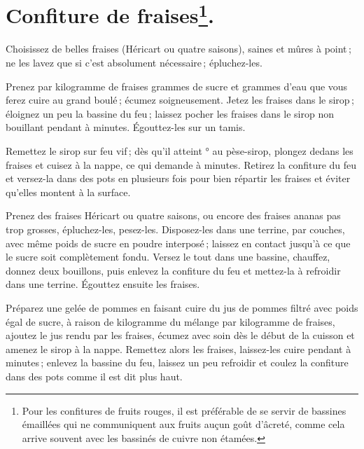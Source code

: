 \section*{\centering Confiture de fraises\footnote{Pour les confitures de
fruits rouges, il est préférable de se servir de bassines émaillées qui ne
communiquent aux fruits auçun goût d'âcreté, comme cela arrive souvent avec les
bassinés de cuivre non étamées.}.}
{}

Choisissez de belles fraises (Héricart ou quatre saisons), saines et mûres à
point ; ne les lavez que si c'est absolument nécessaire ; épluchez-les.

Prenez par kilogramme de fraises {\mmm} grammes de sucre et
{\mmm} grammes d'eau que vous ferez cuire au grand boulé ; écumez
soigneusement. Jetez les fraises dans le sirop ; éloignez un peu la bassine du
feu ; laissez pocher les fraises dans le sirop non bouillant pendant
{\mmm} à {\mmm} minutes. Égouttez-les sur un tamis.

Remettez le sirop sur feu vif ; dès qu'il atteint {\mmm}° au pèse-sirop,
plongez dedans les fraises et cuisez à la nappe, ce qui demande {\mmm}
à {\mmm} minutes. Retirez la confiture du feu et versez-la dans des pots
en plusieurs fois pour bien répartir les fraises et éviter qu'elles montent
à la surface.

\sk

Prenez des fraises Héricart ou quatre saisons, ou encore des fraises ananas pas
trop grosses, épluchez-les, pesez-les. Disposez-les dans une terrine, par
couches, avec même poids de sucre en poudre interposé ; laissez en contact
jusqu'à ce que le sucre soit complètement fondu. Versez le tout dans une
bassine, chauffez, donnez deux bouillons, puis enlevez la confiture du feu et
mettez-la à refroidir dans une terrine. Égouttez ensuite les fraises.

Préparez une gelée de pommes en faisant cuire du jus de pommes filtré avec
poids égal de sucre, à raison de {\mmm} kilogramme du mélange par
kilogramme de fraises, ajoutez le jus rendu par les fraises, écumez avec soin
dès le début de la cuisson et amenez le sirop à la nappe. Remettez alors les
fraises, laissez-les cuire pendant {\mmm} à {\mmm} minutes ; enlevez
la bassine du feu, laissez un peu refroidir et coulez la confiture dans des
pots comme il est dit plus haut.

\medskip

